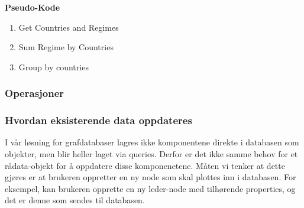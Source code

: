 \textbf{Pseudo-Kode}
\begin{enumerate}
  \item Get Countries and Regimes
  \item Sum Regime by Countries
  \item Group by countries
\end{enumerate}

\subsubsection{Operasjoner}



\subsubsection{Hvordan eksisterende data oppdateres}
I vår løsning for grafdatabaser lagres ikke komponentene direkte i databasen som objekter, men blir 
heller laget via queries. Derfor er det ikke samme behov for et rådata-objekt for å oppdatere disse 
komponenetene. Måten vi tenker at dette gjøres er at brukeren oppretter en ny node som skal 
plottes inn i databasen. For eksempel, kan brukeren opprette en ny leder-node med tilhørende 
properties, og det er denne som sendes til databasen.